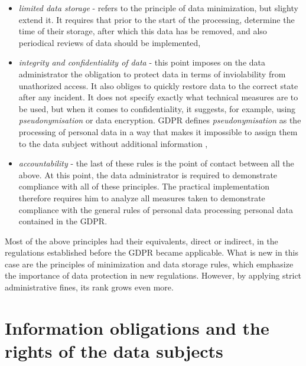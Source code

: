 \documentclass[en, noamssymb]{mgr}
\begin{document}
\begin{itemize}
\item \textit{limited data storage} - refers to the principle of data minimization, but slighty extend it. It requires that prior to the start of the processing, determine the time of their storage, after which this data has be removed, and also periodical reviews of data should be implemented,

\item \textit{integrity and confidentiality of data} - this point imposes on the data administrator the obligation to protect data in terms of inviolability from unathorized access. It also obliges to quickly restore data to the correct state after any incident. It does not specify exactly what technical measures are to be used, but when it comes to confidentiality, it suggests, for example, using \textit{pseudonymisation} or data encryption. GDPR defines \textit{pseudonymisation} as the processing of personal data in a way that makes it impossible to assign them to the data subject without additional information \cite{rodo_art4},

\item \textit{accountability} - the last of these rules is the point of contact between all the above. At this point, the data administrator is required to demonstrate compliance with all of these principles. The practical implementation therefore requires him to analyze all measures taken to demonstrate compliance with the general rules of personal data processing personal data contained in the GDPR.
\end{itemize}

Most of the above principles had their equivalents, direct or indirect, in the regulations established before the GDPR became applicable. What is new in this case are the principles of minimization and data storage rules, which emphasize the importance of data protection in new regulations. However, by applying strict administrative fines, its rank grows even more.

\section{Information obligations and the rights of the data subjects}
\end{document}

